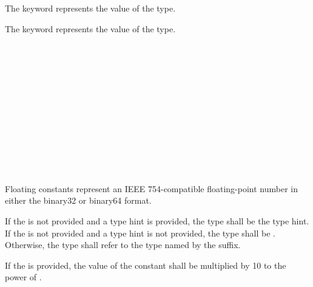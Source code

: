 \specsubsubitem
The  keyword represents the  value of the
 type.

\specsubsubitem
The  keyword represents the  value of the
 type.


\begin{grammar}
 \exactly \\
	     \\
	   \\

 \oneof \\
	 \\

 \exactly \\
	  \\

 \oneof \\
	 \\

 \exactly \\
	  \\
\end{grammar}

Floating constants represent an IEEE 754-compatible floating-point
number in either the binary32 or binary64 format.

\specsubitem
If the  is not provided and a type hint is
provided, the type shall be the type hint. If the 
is not provided and a type hint is not provided, the type shall be
. Otherwise, the type shall refer to the type named by the suffix.

\specsubitem
If the  is provided, the value of the
constant shall be multiplied by 10 to the power of
.


